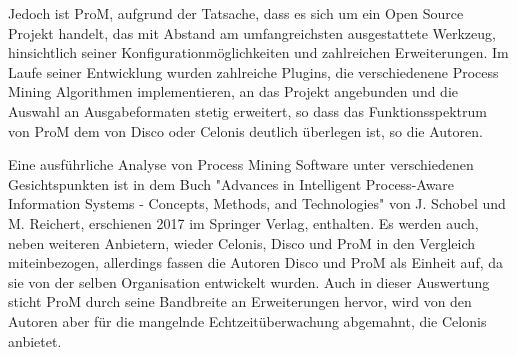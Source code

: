 \begin{table}[!h]
\centering
{}
\caption{Angaben von Anwendern zu ihrem Umgang mit Process Mining Software (Quelle: Auszug aus Tabelle 5: Fragenkatalog 5, Verstraete, Comparative Study of Process Mining Software, S. 29 \cite{compPM} }
\label{comparison}
\end{table}

\normalsize
Jedoch ist ProM, aufgrund der Tatsache, dass es sich um ein Open Source Projekt handelt, das mit Abstand am umfangreichsten ausgestattete Werkzeug,  hinsichtlich seiner Konfigurationmöglichkeiten und zahlreichen Erweiterungen. 
Im Laufe seiner Entwicklung wurden zahlreiche Plugins, die verschiedenene Process Mining Algorithmen implementieren, an das Projekt angebunden und die Auswahl an Ausgabeformaten stetig erweitert, so dass das Funktionsspektrum von ProM dem von Disco oder Celonis deutlich überlegen ist, so die Autoren. 

Eine ausführliche Analyse von Process Mining Software unter verschiedenen Gesichtspunkten ist in dem Buch "Advances in Intelligent Process-Aware Information Systems - Concepts, Methods, and Technologies" von J. Schobel und M.  Reichert, erschienen 2017 im Springer Verlag, enthalten\cite{Schobel2017}. Es werden auch, neben weiteren Anbietern, wieder Celonis, Disco und ProM in den Vergleich miteinbezogen, allerdings fassen die Autoren Disco und ProM als Einheit auf, da sie von der selben Organisation entwickelt wurden. Auch in dieser Auswertung sticht ProM durch seine Bandbreite an Erweiterungen hervor, wird von den Autoren aber für die mangelnde Echtzeitüberwachung abgemahnt, die Celonis anbietet.

